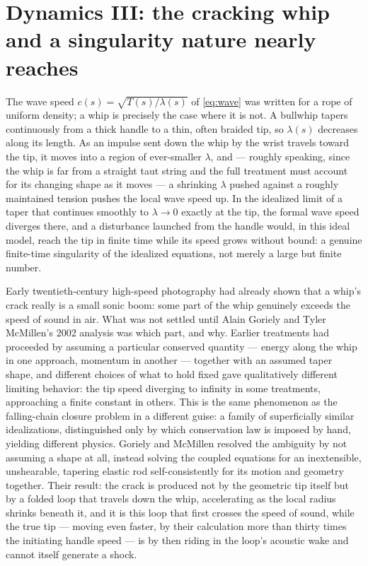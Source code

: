 \documentclass[11pt]{book}
\begin{document}
\section[Dynamics III: the cracking whip]{Dynamics III: the cracking whip and a singularity nature nearly reaches}
\label{sec:whip}

The wave speed $c(s)=\sqrt{T(s)/\lambda(s)}$ of \eqref{eq:wave} was written for a rope of uniform density; a whip is precisely the case where it is not. A bullwhip tapers continuously from a thick handle to a thin, often braided tip, so $\lambda(s)$ decreases along its length. As an impulse sent down the whip by the wrist travels toward the tip, it moves into a region of ever-smaller $\lambda$, and --- roughly speaking, since the whip is far from a straight taut string and the full treatment must account for its changing shape as it moves --- a shrinking $\lambda$ pushed against a roughly maintained tension pushes the local wave speed up. In the idealized limit of a taper that continues smoothly to $\lambda\to 0$ exactly at the tip, the formal wave speed diverges there, and a disturbance launched from the handle would, in this ideal model, reach the tip in finite time while its speed grows without bound: a genuine finite-time singularity of the idealized equations, not merely a large but finite number.

Early twentieth-century high-speed photography had already shown that a whip's crack really is a small sonic boom: some part of the whip genuinely exceeds the speed of sound in air. What was not settled until Alain Goriely and Tyler McMillen's 2002 analysis was which part, and why. Earlier treatments had proceeded by assuming a particular conserved quantity --- energy along the whip in one approach, momentum in another --- together with an assumed taper shape, and different choices of what to hold fixed gave qualitatively different limiting behavior: the tip speed diverging to infinity in some treatments, approaching a finite constant in others. This is the same phenomenon as the falling-chain closure problem in a different guise: a family of superficially similar idealizations, distinguished only by which conservation law is imposed by hand, yielding different physics. Goriely and McMillen resolved the ambiguity by not assuming a shape at all, instead solving the coupled equations for an inextensible, unshearable, tapering elastic rod self-consistently for its motion and geometry together. Their result: the crack is produced not by the geometric tip itself but by a folded loop that travels down the whip, accelerating as the local radius shrinks beneath it, and it is this loop that first crosses the speed of sound, while the true tip --- moving even faster, by their calculation more than thirty times the initiating handle speed --- is by then riding in the loop's acoustic wake and cannot itself generate a shock.
\end{document}
